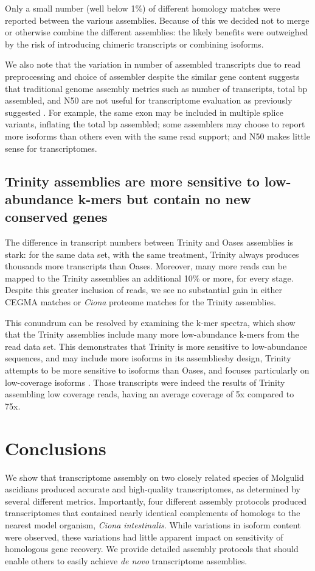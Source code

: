 Only a small number (well below 1\%) of different homology matches were reported between the various assemblies.  Because of this we decided not to merge or otherwise combine the different assemblies: the likely benefits were outweighed by the risk of introducing chimeric transcripts or combining isoforms.

We also note that the variation in number of assembled transcripts due to read preprocessing and choice of assembler despite the similar gene content suggests that traditional genome assembly metrics such as number of transcripts, total bp assembled, and N50 are not useful for transcriptome evaluation as previously suggested \citep{oneil_assessing_2013}.  For example, the same exon may be included in multiple splice variants, inflating the total bp assembled; some assemblers may choose to report more isoforms than others even with the same read support; and N50 makes little sense for transcriptomes.
 
\subsection{Trinity assemblies are more sensitive to low-abundance k-mers but contain no new conserved genes}
The difference in transcript numbers between Trinity and Oases assemblies is stark: for the same data set, with the same treatment, Trinity always produces thousands more transcripts than Oases.  Moreover, many more reads can be mapped to the Trinity assemblies \textemdash an additional 10\% or more, for every stage.  Despite this greater inclusion of reads, we see no substantial gain in either CEGMA matches or \textit{Ciona} proteome matches for the Trinity assemblies.

This conundrum can be resolved by examining the k-mer spectra, which show that the Trinity assemblies include many more low-abundance k-mers from the read data set.  This demonstrates that Trinity is more sensitive to low-abundance sequences, and may include more isoforms in its assemblies\textemdash by design, Trinity attempts to be more sensitive to isoforms than Oases, and focuses particularly on low-coverage isoforms \citep{vijay_challenges_2012, grabherr_full-length_2011, van_belleghem_novo_2012}. Those transcripts were indeed the results of Trinity assembling low coverage reads, having an average coverage of 5x compared to 75x.
 
\section{Conclusions}
We show that transcriptome assembly on two closely related species of Molgulid ascidians produced accurate and high-quality transcriptomes, as determined by several different metrics.  Importantly, four different assembly protocols produced transcriptomes that contained nearly identical complements of homologs to the nearest model organism, \textit{Ciona intestinalis}.  While variations in isoform content were observed, these variations had little apparent impact on sensitivity of homologous gene recovery. We provide detailed assembly protocols that should enable others to easily achieve \textit{de novo} transcriptome assemblies.

